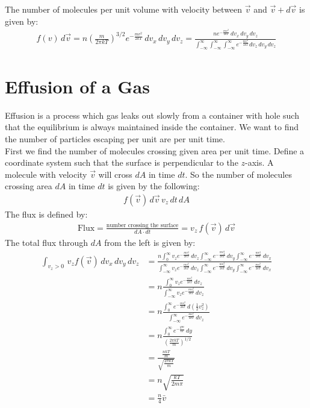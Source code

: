 \documentclass[11pt,oneside]{book}
\theoremstyle{break}
\theoremstyle{break}
\newcommand{\lr}[1]{\left( #1 \right)}
\begin{document}
The number of molecules per unit volume with velocity between $\vec{v}$ and $\vec{v}+d\vec{v}$ is given by:
\begin{align*}
f(v)\, d\vec{v} = n \lr{\frac{m}{2\pi kT}}^{3/2} e^{-\frac{mv^2}{2kT}}\, dv_x\,dv_y\,dv_z = \frac{ne^{-\frac{mv^2}{2kT}}\, dv_x\,dv_y\,dv_z}{\int_{-\infty}^{\infty}\int_{-\infty}^{\infty}\int_{-\infty}^{\infty} e^{-\frac{mv^2}{2kT}} dv_z \, dv_y \, dv_z}
\end{align*}
\hfill\break
\newpage
\section[Effusion of a Gas]{\color{red} Effusion of a Gas\color{black}}
Effusion is a process which gas leaks out slowly from a container with hole  such that the equilibrium is always maintained inside the container. We want to find the number of particles escaping per unit are per unit time. \\

First we find the number of molecules crossing given area per unit time. Define a coordinate system such that the surface is perpendicular to the $z$-axis. A molecule with velocity $\vec{v}$ will cross $dA$ in time $dt$. So the number of molecules crossing area $dA$ in time $dt$ is given by the following:
\begin{align*}
f(\vec{v})\, d\vec{v} \, v_z \, dt \, dA
\end{align*}
The flux is defined by:
\begin{align*}
\text{Flux} = \frac{\text{number crossing the surface}}{dA\cdot dt} = v_z \, f(\vec{v})\, d\vec{v}
\end{align*}
The total flux through $dA$ from the left is given by:
\begin{align*}
\int_{v_z >0}\, v_z f(\vec{v})\, dv_x\,dv_y\, dv_z &= \frac{n \int_0^{\infty}v_z e^{-\frac{mv_z^2}{2kT}}\,dv_z \int_{-\infty}^{\infty} e^{-\frac{mv_y^2}{2kT}}\, dv_y \int_{-\infty}^{\infty} e^{-\frac{mv_x^2}{2kT}}\, dv_x}{ \int_{-\infty}^{\infty}v_z e^{-\frac{mv_z^2}{2kT}}\,dv_z \int_{-\infty}^{\infty} e^{-\frac{mv_y^2}{2kT}}\, dv_y \int_{-\infty}^{\infty} e^{-\frac{mv_x^2}{2kT}}\, dv_x}\\
&= n \frac{\int_0^{\infty}v_z e^{-\frac{mv_z^2}{2kT}}\,dv_z }{\int_{-\infty}^{\infty}v_z e^{-\frac{mv_z^2}{2kT}}\,dv_z } \\
&= n \frac{\int_0^{\infty} e^{-\frac{mv_z^2}{2kT}}\, d\lr{\frac{1}{2}v_z^2}}{\int_{-\infty}^{\infty}e^{-\frac{mv_z^2}{2kT}}\, dv_z}\\
&= n \frac{\int_0^\infty e^{-\frac{ym}{kT}}\, dy}{\lr{\frac{2\pi kT}{m}}^{1/2}}\\
&= \frac{\frac{nkT}{m}}{\sqrt{\frac{2\pi kT}{m}}} \\
&= n \sqrt{\frac{kT}{2m \pi}} \\
&= \frac{n}{4}\bar{v}
\end{align*}
\end{document}
